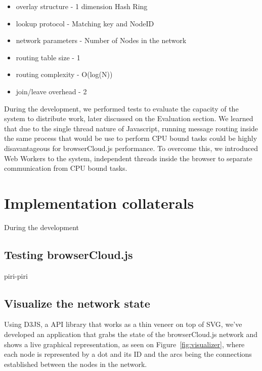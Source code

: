 \begin{itemize}
    \item overlay structure - 1 dimension Hash Ring
    \item lookup protocol - Matching key and NodeID
    \item network parameters - Number of Nodes in the network
    \item routing table size - 1
    \item routing complexity - O(log(N))
    \item join/leave overhead - 2
\end{itemize}

During the development, we performed tests to evaluate the capacity of the system to distribute work, later discussed on the Evaluation section. We learned that due to the single thread nature of Javascript, running message routing inside the same process that would be use to perform CPU bound tasks could be highly disavantageous for browserCloud.js performance. To overcome this, we introduced Web Workers to the system, independent threads inside the browser to separate communication from CPU bound tasks.

\section{Implementation collaterals}

During the development

\subsection{Testing browserCloud.js}

piri-piri


\subsection{Visualize the network state}

Using D3JS, a API library that works as a thin veneer on top of SVG, we've developed an application that grabs the state of the browserCloud.js network and shows a live graphical representation, as seen on Figure~\ref{fig:visualizer}, where each node is represented by a dot and its ID and the arcs being the connections established between the nodes in the network.

